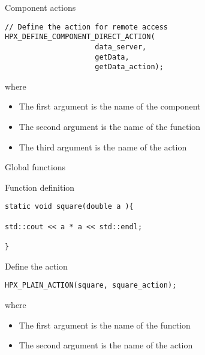 \documentclass[12pt,t]{beamer}
\begin{document}
\begin{frame}[fragile]{Component actions}

\begin{lstlisting}
// Define the action for remote access
HPX_DEFINE_COMPONENT_DIRECT_ACTION(
                     data_server,
                     getData,
                     getData_action);
\end{lstlisting}
where
\begin{itemize}
\item The first argument is the name of the component
\item The second argument is the name of the function
\item The third argument is the name of the action
\end{itemize}
\end{frame}

\begin{frame}[fragile]{Global functions}

\begin{block}{Function definition}
\begin{lstlisting}
static void square(double a ){

std::cout << a * a << std::endl;

}
\end{lstlisting}
\end{block}

\begin{block}{Define the action}
\begin{lstlisting}
HPX_PLAIN_ACTION(square, square_action);
\end{lstlisting}
where
\begin{itemize}
\item The first argument is the name of the function
\item The second argument is the name of the action
\end{itemize}

\end{block}
\end{frame}
\end{document}
